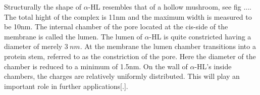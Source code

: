 Structurally the shape of $\alpha$-HL resembles that of a hollow mushroom, see fig ....
The total hight of the complex is 11nm and the maximum width is measured to be 10nm. The
internal chamber of the pore located at the cis-side of the membrane is called the lumen.
The lumen of $\alpha$-HL is quite constricted having a diameter of merely $3\ nm$.  At
the membrane the lumen chamber transitions into a protein stem, referred to as the
constriction of the pore. Here the diameter of the chamber is reduced to a minimum of
1.5nm. On the wall of $\alpha$-HL's inside chambers, the charges are relatively uniformly
distributed. This will play an important role in further applications[.].
%
%
%
%

